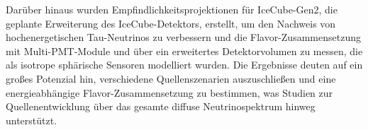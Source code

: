Darüber hinaus wurden Empfindlichkeitsprojektionen für IceCube-Gen2, die geplante Erweiterung des IceCube-Detektors, erstellt, um den Nachweis von hochenergetischen Tau-Neutrinos zu verbessern und die Flavor-Zusammensetzung mit Multi-PMT-Module und über ein erweitertes Detektorvolumen zu messen, die als isotrope sphärische Sensoren modelliert wurden. Die Ergebnisse deuten auf ein großes Potenzial hin, verschiedene Quellenszenarien auszuschließen und eine energieabhängige Flavor-Zusammensetzung zu bestimmen, was Studien zur Quellenentwicklung über das gesamte diffuse Neutrinospektrum hinweg unterstützt.